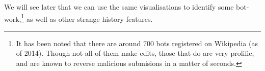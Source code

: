 We will see later that we can use the same visualisations to identify
some bot-work,\footnote{It has been noted that there are around 700
  bots registered on Wikipedia (as of 2014). Though not all of them
  make edits, those that do are very prolific, and are known to
  reverse malicious submisions in a matter of
  seconds.\cite{wiki-bots}\cite{bbc-bots}} as well as other strange
history features.




